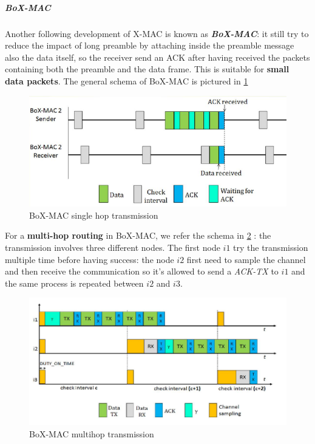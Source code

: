 \documentclass[10pt,a4paper]{report}
\theoremstyle{definition}
\begin{document}
\subparagraph{BoX-MAC}
Another following development of X-MAC is known as \textit{\textbf{BoX-MAC}}: it still try to reduce the impact of long preamble by attaching inside the preamble message also the data itself, so the receiver send an ACK after having received the packets containing both the preamble and the data frame. This is suitable for \textbf{small data packets}. The general schema of BoX-MAC is pictured in \ref{box-max}
\begin{figure}[h]
	\centering\includegraphics[scale=0.50]{images/Pasted image 20230409091352.png}
	\caption{BoX-MAC single hop transmission}
\label{box-max}
\end{figure}


For a \textbf{multi-hop routing} in BoX-MAC, we refer the schema in \ref{boxmax-multihop} : the transmission involves three different nodes. The first node $i1$ try the transmission multiple time before having success: the node $i2$ first need to sample the channel and then receive the communication so it's allowed to send a \textit{ACK-TX} to $i1$ and the same process is repeated between $i2$ and $i3$.

\begin{figure}[h!]
	\centering\includegraphics[scale=0.40]{images/Pasted image 20230409091501.png}
	\caption{BoX-MAC multihop transmission}
	\label{boxmax-multihop}
\end{figure}
\end{document}
